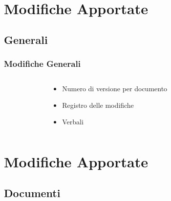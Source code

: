 \section{Modifiche Apportate}
\subsection{Generali}

\begin{frame}
	\frametitle{Modifiche Generali}
	
		
		\begin{columns}
			\begin{column}{0.2\textwidth}
				
			\end{column}
			
			\begin{column}{0.4\textwidth}
				\begin{itemize}
					\item Numero di versione per documento
					\item Registro delle modifiche
					\item Verbali
				
				\end{itemize}
			\end{column}
			
			\begin{column}{0.2\textwidth}
				
			\end{column}
		\end{columns}
		
		
\end{frame}

\section{Modifiche Apportate}
\subsection{Documenti}

